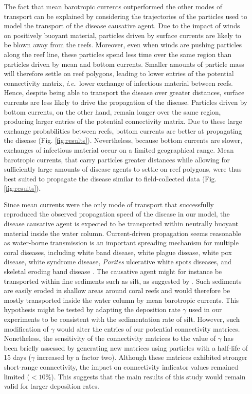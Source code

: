 \documentclass[utf8]{frontiersSCNS}
\newcommand{\ie}{{\it i.e.}\ }
\begin{document}
The fact that mean barotropic currents outperformed the other modes of transport can be explained by considering the trajectories of the particles used to model the transport of the disease causative agent. Due to the impact of winds on positively buoyant material, particles driven by surface currents are likely to be blown away from the reefs. Moreover, even when winds are pushing particles along the reef line, these particles spend less time over the same region than particles driven by mean and bottom currents. Smaller amounts of particle mass will therefore settle on reef polygons, leading to lower entries of the potential connectivity matrix, \ie lower exchange of infectious material between reefs. Hence, despite being able to transport the disease over greater distances, surface currents are less likely to drive the propagation of the disease. Particles driven by bottom currents, on the other hand, remain longer over the same region, producing larger entries of the potential connectivity matrix. Due to these large exchange probabilities between reefs, bottom currents are better at propagating the disease (Fig. \ref{fig:results}). Nevertheless, because bottom currents are slower, exchanges of infectious material occur on a limited geographical range. Mean barotropic currents, that carry particles greater distances while allowing for sufficiently large amounts of disease agents to settle on reef polygons, were thus best suited to propagate the disease similar to field-collected data (Fig. \ref{fig:results}).

Since mean currents were the only mode of transport that successfully reproduced the observed propagation speed of the disease in our model, the disease causative agent is expected to be transported within neutrally buoyant material inside the water column. Current-driven propagation seems reasonable as water-borne transmission is an important spreading mechanism for multiple coral diseases, including white band disease, white plague disease, white pox disease, white syndrome disease, \textit{Porites} ulcerative white spots diseases, and skeletal eroding band disease \citep{shore2019modes}. The causative agent might for instance be transported within fine sediments such as silt, as suggested by \cite{rosales2020rhodobacterales}. Such sediments are easily eroded in shallow areas around coral reefs and would therefore be mostly transported inside the water column by mean barotropic currents. This hypothesis might be tested by adapting the deposition rate $\gamma$ used in our experiments to be consistent with the sedimentation rate of silt. However, such modification of $\gamma$ would alter the entries of our potential connectivity matrices. Nonetheless, the sensitivity of the connectivity matrices to the value of $\gamma$ has been briefly assessed by generating new matrices using particles with a half-life of 15 days ($\gamma$ increased by a factor two). Although these matrices exhibited stronger short-range connectivity, the impact on connectivity indicator values remained  limited ($<10\%$). This suggests that the main results of this study would remain valid for larger deposition rates.  
\end{document}
